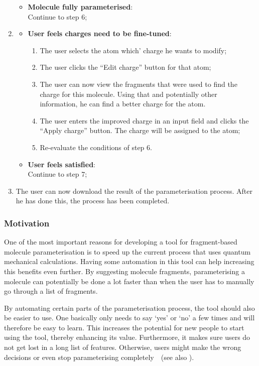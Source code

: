 \begin{enumerate}[itemsep=.1em, parsep=.2em, topsep=0em]
\begin{itemize}[leftmargin=0cm, itemsep=.1em, parsep=.1em]
  \item[] {\bf Molecule fully parameterised}:\\Continue to step 6;
  \end{itemize}
\item
  \begin{itemize}[leftmargin=0cm, itemsep=.1em, parsep=.1em]
  \item[] {\bf User feels charges need to be fine-tuned}:
    \begin{enumerate}
    \item The user selects the atom which' charge he wants to modify;
    \item The user clicks the ``Edit charge'' button for that atom;
    \item The user can now view the fragments that were used to find the charge for this molecule. Using that and potentially other information, he can find a better charge for the atom.
    \item The user enters the improved charge in an input field and clicks the ``Apply charge'' button. The charge will be assigned to the atom;
    \item Re-evaluate the conditions of step 6.
    \end{enumerate}
  \item[]{\bf User feels satisfied}:\\Continue to step 7;
  \end{itemize}
\item The user can now download the result of the parameterisation process. After he has done this, the process has been completed.
\end{enumerate}

\subsubsection{Motivation}
One of the most important reasons for developing a tool for fragment-based molecule parameterisation is to speed up the current process that uses quantum mechanical calculations. Having some automation in this tool can help increasing this benefits even further. By suggesting molecule fragments, parameterising a molecule can potentially be done a lot faster than when the user has to manually go through a list of fragments.

By automating certain parts of the parameterisation process, the tool should also be easier to use. One basically only needs to say `yes' or `no' a few times and will therefore be easy to learn. This increases the potential for new people to start using the tool, thereby enhancing its value. Furthermore, it makes sure users do not get lost in a long list of features. Otherwise, users might make the wrong decisions or even stop parameterising completely~\cite{norman2002design}~(see also ).

